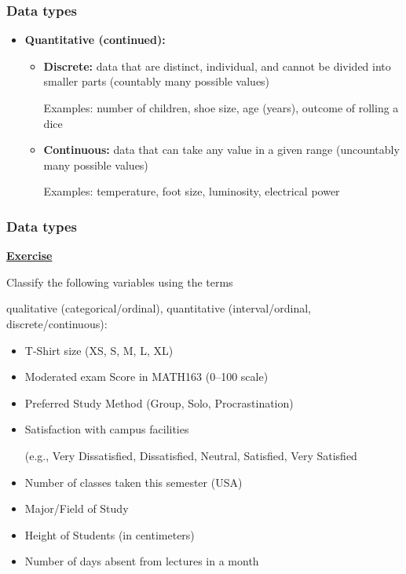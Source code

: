 \documentclass[t,8pt]{beamer}%
\begin{document}
	\begin{frame}
		\frametitle{Data types}
		\begin{itemize}
			\item {\bf Quantitative (continued):}
			\begin{itemize}
				\item {\bf Discrete:} data that are distinct, individual, and cannot be divided into smaller parts (countably many possible values) \par
				Examples: number of children, shoe size, age (years), outcome of rolling a dice
				\item {\bf Continuous:} data that can take any value in a given range (uncountably many possible values) \par
				Examples: temperature, foot size, luminosity, electrical power
			\end{itemize}
		\end{itemize}
	\end{frame}
    
        \begin{frame}
		\frametitle{Data types}
        {\bf\underline{Exercise}} \par
        Classify the following variables using the terms \par
        qualitative (categorical/ordinal), quantitative (interval/ordinal, discrete/continuous):
        \begin{itemize}
            \item T-Shirt size (XS, S, M, L, XL) %
            \item Moderated exam Score in MATH163 (0–100 scale) %
            \item Preferred Study Method (Group, Solo, Procrastination) %
            \item Satisfaction with campus facilities \par
            (e.g., Very Dissatisfied, Dissatisfied, Neutral, Satisfied, Very Satisfied %
            \item Number of classes taken this semester (USA) %
            \item Major/Field of Study %
            \item Height of Students (in centimeters) %
            \item Number of days absent from lectures in a month %
        \end{itemize}
		
	\end{frame}
\end{document}
